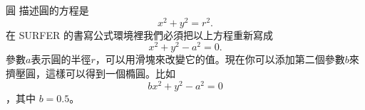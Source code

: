 \begin{surferPage}{圓}
描述圓的方程是
\[x^2+y^2=r^2.\]
在 SURFER 的書寫公式環境裡我們必須把以上方程重新寫成
\[x^2+y^2-a^2=0.\]
參數$a$表示圓的半徑$r$，可以用滑塊來改變它的值。現在你可以添加第二個參數$b$來擠壓圓，這樣可以得到一個橢圓。比如
\[bx^2+y^2-a^2=0\]，其中 $b=0.5$。
\end{surferPage}
